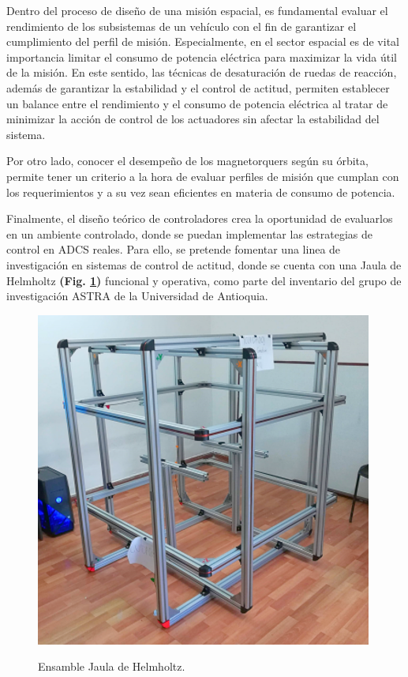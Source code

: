Dentro del proceso de diseño de una misión espacial, es fundamental evaluar el rendimiento de los subsistemas de un vehículo con el fin de garantizar el cumplimiento del perfil de misión. Especialmente, en el sector espacial es de vital importancia limitar el consumo de potencia eléctrica para maximizar la vida útil de la misión. En este sentido, las técnicas de desaturación de ruedas de reacción, además de garantizar la estabilidad y el control de actitud, permiten establecer un balance entre el rendimiento y el consumo de potencia eléctrica al tratar de minimizar la acción de control de los actuadores sin afectar la estabilidad del sistema.

Por otro lado, conocer el desempeño de los magnetorquers según su órbita, permite tener un criterio a la hora de evaluar perfiles de misión que cumplan con los requerimientos y a su vez sean eficientes en materia de consumo de potencia. 

Finalmente, el diseño teórico de controladores crea la oportunidad de evaluarlos en un ambiente controlado, donde se puedan implementar las estrategias de control en ADCS reales. Para ello, se pretende fomentar una linea de investigación en sistemas de control de actitud, donde se cuenta con una Jaula de Helmholtz  \textbf{(Fig. \ref{fig:jaula})} funcional y operativa, como parte del inventario del grupo de investigación ASTRA de la Universidad de Antioquia. 

\begin{figure}[!ht]
	\begin{center}
		\includegraphics[scale=0.65]{imagenes/justificacion/jaula.PNG}\\
	\end{center}
	\caption{Ensamble Jaula de Helmholtz.}
	\label{fig:jaula}
\end{figure}

